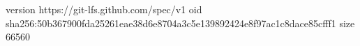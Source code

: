 version https://git-lfs.github.com/spec/v1
oid sha256:50b367900fda25261eae38d6e8704a3c5e139892424e8f97ac1c8dace85cfff1
size 66560
